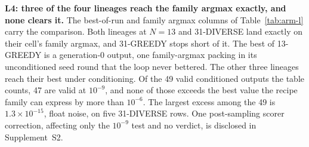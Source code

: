 \textbf{L4: three of the four lineages reach the family argmax exactly, and none clears it.}
The best-of-run and family argmax columns of Table~\ref{tab:arm-l} carry the comparison. Both
lineages at $N = 13$ and 31-DIVERSE land exactly on their cell's family argmax, and 31-GREEDY
stops short of it. The best of 13-GREEDY is a generation-0 output, one family-argmax packing in its unconditioned seed round that
the loop never bettered. The other three lineages reach their best under conditioning. Of the 49 valid
conditioned outputs the table counts, 47 are valid at $10^{-9}$, and none of those exceeds
the best value the recipe family can express by more than $10^{-6}$. The largest excess among
the 49 is $1.3\times10^{-15}$, float noise, on five 31-DIVERSE rows. One post-sampling scorer
correction, affecting only the
$10^{-9}$ test and no verdict, is disclosed in Supplement~S2.
